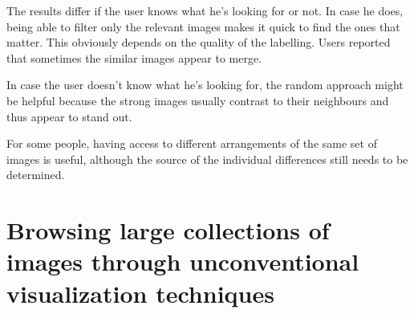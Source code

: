 The results differ if the user knows what he's looking for or not. In case he does, being able to filter only the relevant images makes it quick to find the ones that matter. This obviously depends on the quality of the labelling. Users reported that sometimes the similar images appear to merge.

In case the user doesn't know what he's looking for, the random approach might be helpful because the strong images usually contrast to their neighbours and thus appear to stand out.

For some people, having access to different arrangements of the same set of images is useful, although the source of the individual differences still needs to be determined.



\section{Browsing large collections of images through unconventional visualization techniques} %
\label{sub:Porta}

